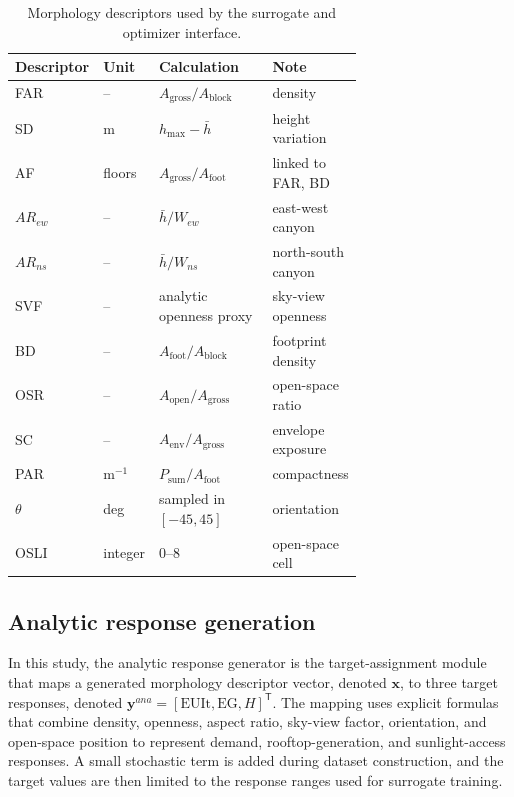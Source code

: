 \documentclass[final,3p,times,numbers,sort&compress]{elsarticle}
\newcommand{\maintablesetup}{%
  \small
  \setlength{\tabcolsep}{4.5pt}%
  \renewcommand{\arraystretch}{1.08}%
}
\def\textcolor#1#2{#2}%
\def\rev#1{#1}%
\newif\ifshowrevision
\newcommand{\rev}[1]{%
  \ifshowrevision{\textcolor{revisionblue}{#1}}\else#1\fi%
}
\newenvironment{revblock}{%
  \ifshowrevision\color{revisionblue}\fi%
}{}
\begin{document}
\begin{table}[!htbp]
\centering
\caption{Morphology descriptors used by the surrogate and optimizer interface.}
\label{tab:descriptors}
\maintablesetup
\begin{threeparttable}
\begin{revblock}
\begin{tabularx}{\linewidth}{@{}p{0.17\linewidth}p{0.13\linewidth}p{0.39\linewidth}X@{}}
\toprule
Descriptor & Unit & Calculation & Note \\
\midrule
FAR & -- & $A_\mathrm{gross}/A_\mathrm{block}$ & density \\
SD & m & $h_\mathrm{max}-\bar h$ & height variation \\
AF & floors & $A_\mathrm{gross}/A_\mathrm{foot}$ & linked to FAR, BD \\
$AR_{ew}$ & -- & $\bar h/W_{ew}$ & east-west canyon \\
$AR_{ns}$ & -- & $\bar h/W_{ns}$ & north-south canyon \\
SVF & -- & analytic openness proxy & sky-view openness \\
BD & -- & $A_\mathrm{foot}/A_\mathrm{block}$ & footprint density \\
OSR & -- & $A_\mathrm{open}/A_\mathrm{gross}$ & open-space ratio \\
SC & -- & $A_\mathrm{env}/A_\mathrm{gross}$ & envelope exposure \\
PAR & m$^{-1}$ & $P_\mathrm{sum}/A_\mathrm{foot}$ & compactness \\
$\theta$ & deg & sampled in $[-45,45]$ & orientation \\
OSLI & integer & $0$--$8$ & open-space cell \\
\bottomrule
\end{tabularx}
\end{revblock}
\end{threeparttable}
\end{table}

\subsection{Analytic response generation}

\rev{In this study, the analytic response generator is the target-assignment module that maps a generated morphology descriptor vector, denoted $\mathbf{x}$, to three target responses, denoted $\mathbf{y}^{ana}=[\mathrm{EUIt},\mathrm{EG},H]^\mathsf{T}$. The mapping uses explicit formulas that combine density, openness, aspect ratio, sky-view factor, orientation, and open-space position to represent demand, rooftop-generation, and sunlight-access responses. A small stochastic term is added during dataset construction, and the target values are then limited to the response ranges used for surrogate training.}
\end{document}
